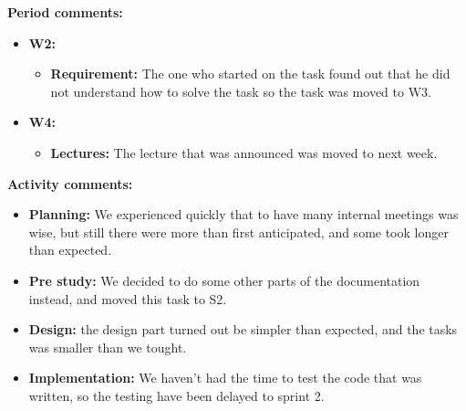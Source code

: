 \textbf{Period comments:}
\begin{itemize}
\item{}\textbf{W2:} 
\begin{itemize}
\item{}\textbf{Requirement:} The one who started on the task found out that he did not understand how to solve the task so the task was moved to W3. 
\end{itemize}
\item{}\textbf{W4:}
\begin{itemize}
\item{} \textbf{Lectures:} The lecture that was announced was moved to next week. 
\end{itemize}
\end{itemize}

\newpage

\textbf{Activity comments:}
\begin{itemize}
\item{}\textbf{Planning:} We experienced quickly that to have many internal meetings was wise, but still there were more than first anticipated, and some took longer than expected. 
\item{}\textbf{Pre study:} We decided to do some other parts of the documentation instead, and moved this task to S2. \item{}\textbf{Design:} the design part turned out be simpler than expected, and the tasks was smaller than we tought. \item{}\textbf{Implementation:} We haven't had the time to test the code that was written, so the testing have been delayed to sprint 2.
\end{itemize}